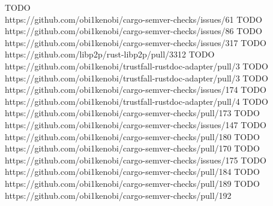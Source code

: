 \documentclass[licencjacka,en]{pracamgr}
\begin{document}
\begin{thebibliography}{99}\label{r:chapter_bibliography}

 TODO \\ https://github.com/obi1kenobi/cargo-semver-checks/issues/61
 TODO \\ https://github.com/obi1kenobi/cargo-semver-checks/issues/86
 TODO \\ https://github.com/obi1kenobi/cargo-semver-checks/issues/317
 TODO \\ https://github.com/libp2p/rust-libp2p/pull/3312
 TODO \\ https://github.com/obi1kenobi/trustfall-rustdoc-adapter/pull/3
 TODO \\ https://github.com/obi1kenobi/trustfall-rustdoc-adapter/pull/3
 TODO \\ https://github.com/obi1kenobi/cargo-semver-checks/issues/174
 TODO \\ https://github.com/obi1kenobi/trustfall-rustdoc-adapter/pull/4
 TODO \\ https://github.com/obi1kenobi/cargo-semver-checks/pull/173
 TODO \\ https://github.com/obi1kenobi/cargo-semver-checks/issues/147
 TODO \\ https://github.com/obi1kenobi/cargo-semver-checks/pull/180
 TODO \\ https://github.com/obi1kenobi/cargo-semver-checks/pull/170
 TODO \\ https://github.com/obi1kenobi/cargo-semver-checks/issues/175
 TODO \\ https://github.com/obi1kenobi/cargo-semver-checks/pull/184
 TODO \\ https://github.com/obi1kenobi/cargo-semver-checks/pull/189
 TODO \\ https://github.com/obi1kenobi/cargo-semver-checks/pull/192

\end{thebibliography}
\end{document}
